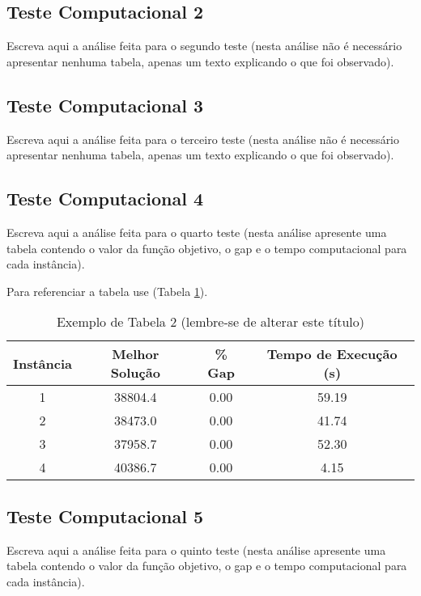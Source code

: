 \documentclass{article}
\begin{document}
\subsection{Teste Computacional 2}

Escreva aqui a análise feita para o segundo teste (nesta análise não é necessário apresentar nenhuma tabela, apenas um texto explicando o que foi observado).


\subsection{Teste Computacional 3}

Escreva aqui a análise feita para o terceiro teste (nesta análise não é necessário apresentar nenhuma tabela, apenas um texto explicando o que foi observado).


\subsection{Teste Computacional 4}

Escreva aqui a análise feita para o quarto teste (nesta análise apresente uma tabela contendo o valor da função objetivo, o gap e o tempo computacional para cada instância).

Para referenciar a tabela use (Tabela \ref{tab:teste4}).

\begin{table}[H]
	\centering
	\caption{Exemplo de Tabela 2 (lembre-se de alterar este título)}
		\begin{tabular}{c c c c} \hline
	 	Instância & Melhor Solução & \% Gap & Tempo de Execução (s) \\ \hline
		1  & 38804.4 & 0.00 & 59.19 \\
		2 & 38473.0 & 0.00 & 41.74 \\ 
		3 & 37958.7 & 0.00 & 52.30 \\
		4 & 40386.7 & 0.00 & 4.15 \\  \hline
		\end{tabular}
  \label{tab:teste4}
\end{table}

\subsection{Teste Computacional 5}

Escreva aqui a análise feita para o quinto teste (nesta análise apresente uma tabela contendo o valor da função objetivo, o gap e o tempo computacional para cada instância).
\end{document}
